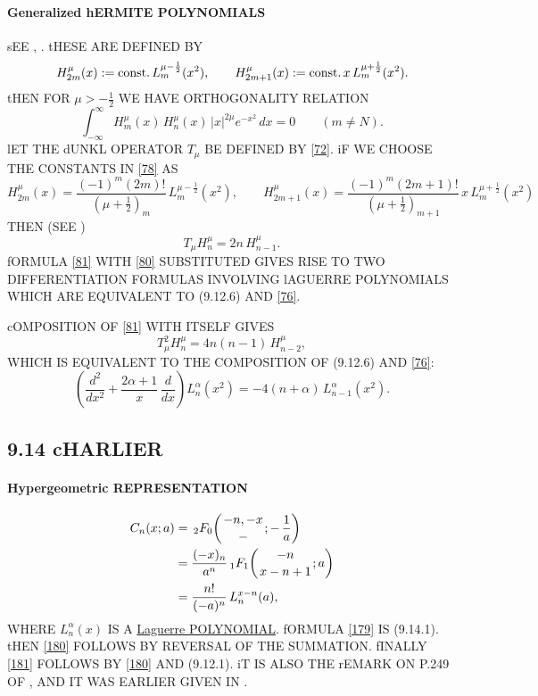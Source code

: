 \documentclass[twoside,11pt]{article}
\newcommand\al\alpha
\newcommand\half{\frac12}
\newcommand\thalf{\tfrac12}
\newcommand\iy\infty
\newcommand\const{{\rm const.}\,}
\newcommand{\hyp}[5]{\,\mbox{}_{#1}F_{#2}\!\left( 
  \genfrac{}{}{0pt}{}{#3}{#4};#5\right)}
\begin{document}
\paragraph{Generalized hERMITE POLYNOMIALS} 
sEE , \cite[Section 1.5.1]{k26}. 
tHESE ARE DEFINED BY 
\begin{equation} 
H_{2m}^\mu(x):=\const L_m^{\mu-\half}(x^2),\qquad 
H_{2m+1}^\mu(x):=\const x\,L_m^{\mu+\half}(x^2). 
\label{78} 
\end{equation} 
tHEN FOR $\mu>-\thalf$ WE HAVE ORTHOGONALITY RELATION 
\begin{equation} 
\int_{-\iy}^{\iy} H_m^\mu(x)\,H_n^\mu(x)\,|x|^{2\mu}e^{-x^2}\,dx 
=0\qquad(m\ne N). 
\label{79} 
\end{equation} 
lET THE dUNKL OPERATOR $T_\mu$ BE DEFINED BY \eqref{72}. 
iF WE CHOOSE THE CONSTANTS IN \eqref{78} AS 
\begin{equation} 
H_{2m}^\mu(x)=\frac{(-1)^m(2m)!}{(\mu+\thalf)_m}\,L_m^{\mu-\half}(x^2),\qquad 
H_{2m+1}^\mu(x)=\frac{(-1)^m(2m+1)!}{(\mu+\thalf)_{m+1}}\, 
 x\,L_m^{\mu+\half}(x^2) 
 \label{80} 
\end{equation} 
THEN (SEE \cite[(1.6)]{K5}) 
\begin{equation} 
T_\mu H_n^\mu=2n\,H_{n-1}^\mu. 
\label{81} 
\end{equation} 
fORMULA \eqref{81} WITH \eqref{80} SUBSTITUTED GIVES RISE TO TWO 
DIFFERENTIATION FORMULAS INVOLVING lAGUERRE POLYNOMIALS WHICH ARE EQUIVALENT TO 
(9.12.6) AND \eqref{76}. 
 
cOMPOSITION OF \eqref{81} WITH ITSELF GIVES 
\[ 
T_\mu^2 H_n^\mu=4n(n-1)\,H_{n-2}^\mu, 
\] 
WHICH IS EQUIVALENT TO THE COMPOSITION OF (9.12.6) AND \eqref{76}: 
\begin{equation} 
\left(\frac{d^2}{dx^2}+\frac{2\al+1}x\,\frac d{dx}\right)L_n^\al(x^2) 
=-4(n+\al)\,L_{n-1}^\al(x^2). 
\label{82} 
\end{equation} 
% 
\subsection*{9.14 cHARLIER} 
\label{sec9.14} 
% 
\paragraph{Hypergeometric REPRESENTATION} 
\begin{align} 
C_n(x;a)&=\hyp20{-n,-x}-{-\,\frac1a} 
\label{179}\\ 
&=\frac{(-x)_n}{a^n} \hyp11{-n}{x-n+1}a 
\label{180}\\ 
&=\frac{n!}{(-a)^n}\,L_n^{x-n}(a), 
\label{181} 
\end{align} 
WHERE $L_n^\al(x)$ IS A 
\hyperref[sec9.12]{Laguerre POLYNOMIAL}. 
fORMULA \eqref{179} IS (9.14.1). tHEN \eqref{180} FOLLOWS BY REVERSAL 
OF THE SUMMATION. fINALLY \eqref{181} FOLLOWS BY \eqref{180} AND 
(9.12.1). iT IS ALSO THE rEMARK ON P.249 OF , AND IT 
WAS EARLIER GIVEN IN . 
% 
\end{document}
